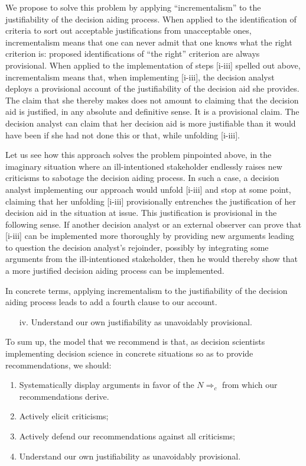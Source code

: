 \documentclass[preprint, french, english, 11pt, authoryear]{elsarticle}%
\begin{document}
We propose to solve this problem by applying ``incrementalism'' to the justifiability of the decision aiding process. When applied to the identification of criteria to sort out acceptable justifications from unacceptable ones, incrementalism means that one can never admit that one knows what the right criterion is: proposed identifications of ``the right'' criterion are always provisional. When applied to the implementation of steps [i-iii] spelled out above, incrementalism means that, when implementing [i-iii], the decision analyst deploys a provisional account of the justifiability of the decision aid she provides. The claim that she thereby makes does not amount to claiming that the decision aid is justified, in any absolute and definitive sense. It is a provisional claim. The decision analyst can claim that her decision aid is more justifiable than it would have been if she had not done this or that, while unfolding [i-iii].

Let us see how this approach solves the problem pinpointed above, in the imaginary situation where an ill-intentioned stakeholder endlessly raises new criticisms to sabotage the decision aiding process. In such a case, a decision analyst implementing our approach would unfold [i-iii] and stop at some point, claiming that her unfolding [i-iii] provisionally entrenches the justification of her decision aid in the situation at issue. This justification is provisional in the following sense. If another decision analyst or an external observer can prove that [i-iii] can be implemented more thoroughly by providing new arguments leading to question the decision analyst's rejoinder, possibly by integrating some arguments from the ill-intentioned stakeholder, then he would thereby show that a more justified decision aiding process can be implemented.

In concrete terms, applying incrementalism to the justifiability of the decision aiding process leads to add a fourth clause to our account.
\begin{itemize}
\item[iv.]	Understand our own justifiability as unavoidably provisional.
\end{itemize}

To sum up, the model that we recommend is that, as decision scientists implementing decision science in concrete situations so as to provide recommendations, we should:
\begin{enumerate}[label=\roman*.]
	\item Systematically display arguments in favor of the $N⇒_c$ from which our recommendations derive.
	\item Actively elicit criticisms;
	\item Actively defend our recommendations against all criticisms;
	\item Understand our own justifiability as unavoidably provisional.
\end{enumerate}
\end{document}
